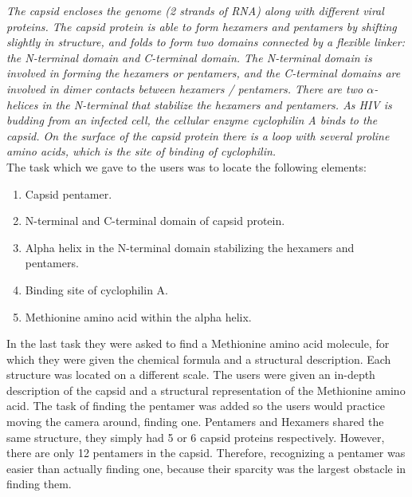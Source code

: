 \documentclass[review,journal]{vgtc}         %
\begin{document}
	\textit{
		The capsid encloses the genome (2 strands of RNA) along with different viral proteins. 
		The capsid protein is able to form hexamers and pentamers by shifting slightly in structure, and folds to form two domains connected by a flexible linker: the N-terminal domain and C-terminal domain. 
		The N-terminal domain is involved in forming the hexamers or pentamers, and the C-terminal domains are involved in dimer contacts between hexamers / pentamers. 
		There are two $\alpha$-helices in the N-terminal that stabilize the hexamers and pentamers. 
		As HIV is budding from an infected cell, the cellular enzyme cyclophilin A binds to the capsid. 
		On the surface of the capsid protein there is a loop with several proline amino acids, which is the site of binding of cyclophilin.}\\
	
	The task which we gave to the users was to locate the following elements:
	
	\begin{enumerate}
		\itemsep0em 
		\item Capsid pentamer.
		\item N-terminal and C-terminal domain of capsid protein.
		\item Alpha helix in the N-terminal domain stabilizing the hexamers and pentamers.
		\item Binding site of cyclophilin A.
		\item Methionine amino acid within the alpha helix.
	\end{enumerate}
	
	In the last task they were asked to find a Methionine amino acid molecule, for which they were given the chemical formula and a structural description.
	Each structure was located on a different scale. 
	The users were given an in-depth description of the capsid and a structural representation of the Methionine amino acid. 
	The task of finding the pentamer was added so the users would practice moving the camera around,  finding one. 
	Pentamers and Hexamers shared the same structure, they simply had 5 or 6 capsid proteins respectively. 
	However, there are only 12 pentamers in the capsid.
	Therefore, recognizing a pentamer was easier than actually finding one, because their sparcity was the largest obstacle in finding them.
	
\end{document}
